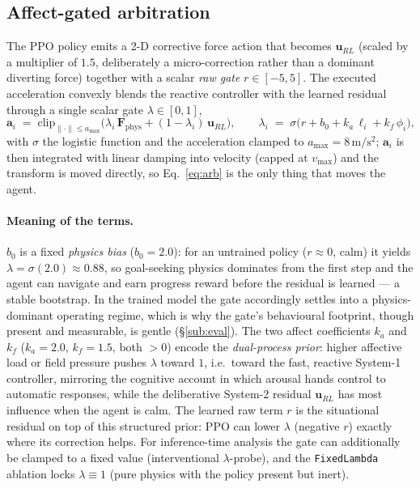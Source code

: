 \documentclass[sigconf,nonacm]{acmart}
\begin{document}
\subsection{Affect-gated arbitration}
\label{sub:arb}
The PPO policy emits a 2-D corrective force action that becomes $\mathbf{u}_{RL}$ (scaled by a multiplier of $1.5$, deliberately a micro-correction rather than a dominant diverting force) together with a scalar \emph{raw gate} $r\in[-5,5]$. The executed acceleration convexly blends the reactive controller with the learned residual through a single scalar gate $\lambda\in[0,1]$,
\begin{equation}
\mathbf{a}_i \;=\; \mathrm{clip}_{\|\cdot\|\le a_{\max}}\!\Big(\lambda_i\,\mathbf{F}_{\mathrm{phys}} + (1-\lambda_i)\,\mathbf{u}_{RL}\Big),\qquad
\lambda_i \;=\; \sigma\big(r + b_0 + k_a\,\ell_i + k_f\,\phi_i\big),
\label{eq:arb}
\end{equation}
with $\sigma$ the logistic function and the acceleration clamped to $a_{\max}=8\,\mathrm{m/s^2}$; $\mathbf{a}_i$ is then integrated with linear damping into velocity (capped at $v_{\max}$) and the transform is moved directly, so Eq.~\eqref{eq:arb} is the only thing that moves the agent.

\paragraph{Meaning of the terms.} $b_0$ is a fixed \emph{physics bias} ($b_0=2.0$): for an untrained policy ($r\!\approx\!0$, calm) it yields $\lambda=\sigma(2.0)\approx0.88$, so goal-seeking physics dominates from the first step and the agent can navigate and earn progress reward before the residual is learned --- a stable bootstrap. In the trained model the gate accordingly settles into a physics-dominant operating regime, which is why the gate's behavioural footprint, though present and measurable, is gentle (\S\ref{sub:eval}). The two affect coefficients $k_a$ and $k_f$ ($k_a=2.0$, $k_f=1.5$, both $>0$) encode the \emph{dual-process prior}: higher affective load or field pressure pushes $\lambda$ toward $1$, i.e.\ toward the fast, reactive System-1 controller, mirroring the cognitive account in which arousal hands control to automatic responses, while the deliberative System-2 residual $\mathbf{u}_{RL}$ has most influence when the agent is calm. The learned raw term $r$ is the situational residual on top of this structured prior: PPO can lower $\lambda$ (negative $r$) exactly where its correction helps. For inference-time analysis the gate can additionally be clamped to a fixed value (interventional $\lambda$-probe), and the \texttt{FixedLambda} ablation locks $\lambda\equiv1$ (pure physics with the policy present but inert).
\end{document}
